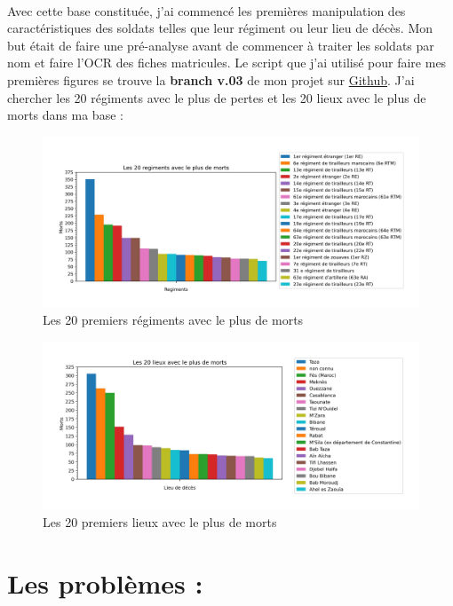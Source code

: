 \documentclass[12pt]{article}
\begin{document}
\paragraph*{}
Avec cette base constituée, j'ai commencé les premières manipulation des caractéristiques des soldats telles que leur régiment ou leur lieu de décès. Mon but était de faire une pré-analyse avant de commencer à traiter les soldats par nom et faire l'OCR des fiches matricules. Le script que j'ai utilisé pour faire mes premières figures se trouve la \textbf{branch v.03} de mon projet sur \href{https://github.com/the0phil3/projetMemoire/tree/v.03}{Github}. J'ai chercher les 20 régiments avec le plus de pertes et les 20 lieux avec le plus de morts dans ma base :
\begin{figure}[!ht]
	\centering
    \includegraphics[scale=0.6]{20regiments.jpg}
    \caption{Les 20 premiers régiments avec le plus de morts}
    \label{fig:20regiments}
\end{figure}  
\begin{figure}[!hb]
	\centering
    \includegraphics[scale=0.6]{20places.jpg}
    \caption{Les 20 premiers lieux avec le plus de morts}
    \label{fig:20places}
\end{figure}  

\section{Les problèmes :}
\end{document}
